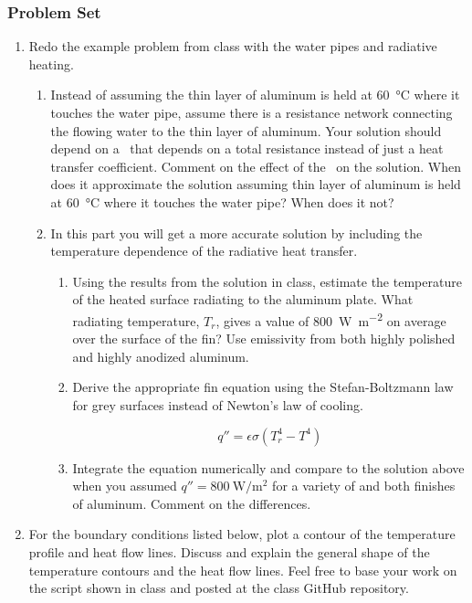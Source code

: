 \documentclass[12pt,letterpaper]{article}
\begin{document}
\subsubsection*{Problem Set}
\begin{enumerate}

\item Redo the example problem from class with the water pipes and radiative heating.
	
	\begin{enumerate}
		\item Instead of assuming the thin layer of aluminum is held at \SI{60}{\celsius} where it touches the water pipe, assume there is a resistance network connecting the flowing water to the thin layer of aluminum.
			Your solution should depend on a \Bi~that depends on a total resistance instead of just a heat transfer coefficient.
			Comment on the effect of the \Bi~on the solution.
			When does it approximate the solution assuming thin layer of aluminum is held at \SI{60}{\celsius} where it touches the water pipe?
			When does it not?
		\item In this part you will get a more accurate solution by including the temperature dependence of the radiative heat transfer.
			\begin{enumerate}
				\item Using the results from the solution in class, estimate the temperature of the heated surface radiating to the aluminum plate.
					What radiating temperature, $T_r$, gives a value of \SI{800}{\watt\per\square\meter} on average over the surface of the fin?
					Use emissivity from both highly polished and highly anodized aluminum.
				\item Derive the appropriate fin equation using the Stefan-Boltzmann law for grey surfaces instead of Newton's law of cooling.
				
				\begin{equation*}
					q'' = \epsilon \sigma \left( T_r^4 - T^4 \right)
				\end{equation*}
				
				\item Integrate the equation numerically and compare to the solution above when you assumed $q'' = \SI{800}{\watt\per\square\meter}$ for a variety of \Bi and both finishes of aluminum.
					Comment on the differences.
			\end{enumerate}
	\end{enumerate}

\item For the boundary conditions listed below, plot a contour of the temperature profile and heat flow lines.
	Discuss and explain the general shape of the temperature contours and the heat flow lines.
	Feel free to base your work on the script shown in class and posted at the class GitHub repository.


\end{enumerate}
\end{document}
